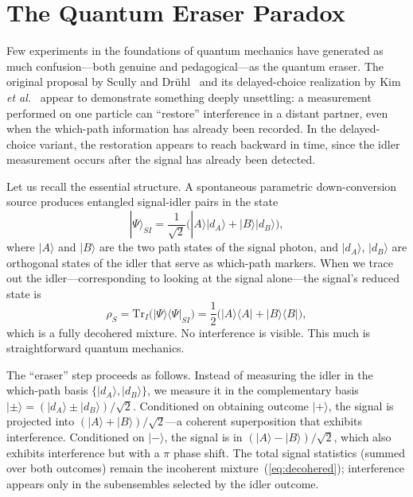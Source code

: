 \documentclass[12pt]{article}
\theoremstyle{definition}
\theoremstyle{remark}
\newcommand{\Tr}{\mathrm{Tr}}
\newcommand{\ket}[1]{|#1\rangle}
\newcommand{\op}[2]{|#1\rangle\langle#2|}
\begin{document}
\section{The Quantum Eraser Paradox}
\label{sec:eraser}

Few experiments in the foundations of quantum mechanics have generated
as much confusion---both genuine and pedagogical---as the quantum eraser.
The original proposal by Scully and Dr\"uhl~\cite{Scully1982}
and its delayed-choice realization by Kim \emph{et al.}~\cite{Kim2000}
appear to demonstrate something deeply unsettling: a measurement
performed on one particle can ``restore'' interference in a distant
partner, even when the which-path information has already been
recorded.  In the delayed-choice variant, the restoration appears to
reach backward in time, since the idler measurement occurs after the
signal has already been detected.

Let us recall the essential structure.  A spontaneous parametric
down-conversion source produces entangled signal-idler pairs in the state
\begin{equation}
\ket{\Psi}_{SI} = \frac{1}{\sqrt{2}}
\big(\ket{A}\ket{d_A} + \ket{B}\ket{d_B}\big),
\label{eq:entangled}
\end{equation}
where $\ket{A}$ and $\ket{B}$ are the two path states of the
signal photon, and $\ket{d_A}$, $\ket{d_B}$ are orthogonal
states of the idler that serve as which-path markers.
When we trace out the idler---corresponding to looking at the signal
alone---the signal's reduced state is
\begin{equation}
\rho_S = \Tr_I\big(\op{\Psi}{\Psi}_{SI}\big)
= \frac{1}{2}\big(\op{A}{A} + \op{B}{B}\big),
\label{eq:decohered}
\end{equation}
which is a fully decohered mixture.  No interference is visible.
This much is straightforward quantum mechanics.

The ``eraser'' step proceeds as follows.  Instead of measuring
the idler in the which-path basis $\{\ket{d_A}, \ket{d_B}\}$,
we measure it in the complementary basis
$\ket{\pm} = (\ket{d_A} \pm \ket{d_B})/\sqrt{2}$.
Conditioned on obtaining outcome $\ket{+}$, the signal is projected
into $(\ket{A} + \ket{B})/\sqrt{2}$---a coherent superposition
that exhibits interference.  Conditioned on $\ket{-}$, the signal
is in $(\ket{A} - \ket{B})/\sqrt{2}$, which also exhibits
interference but with a $\pi$ phase shift.  The total signal
statistics (summed over both outcomes) remain the incoherent
mixture~(\ref{eq:decohered}); interference appears only in the
subensembles selected by the idler outcome.
\end{document}
